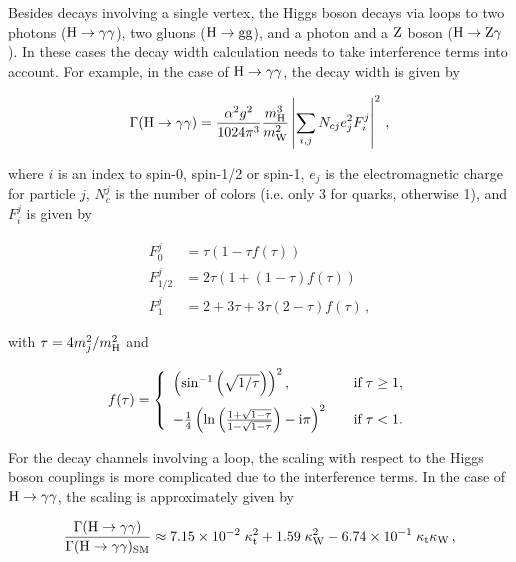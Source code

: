 Besides decays involving a single vertex, the Higgs boson decays via loops to two photons ($\mathrm{H}\to\mathrm{\gamma}\mathrm{\gamma}$), two gluons ($\mathrm{H}\to\mathrm{g}\mathrm{g}$), and a photon and a $\mathrm{Z}$ boson ($\mathrm{H}\to\mathrm{Z}\mathrm{\gamma}$).
% 
In these cases the decay width calculation needs to take interference terms into account.
% 
For example, in the case of $\mathrm{H}\to\mathrm{\gamma}\mathrm{\gamma}$, the decay width is given by~\cite{higgshunter}
% 
\begin{linenomath*}
\begin{equation}
\Gamma(\mathrm{H}\to\mathrm{\gamma}\mathrm{\gamma}) =
\frac{\alpha^2g^2}{1024\pi^3} \frac{m_{\mathrm{H}}^3}{m_\mathrm{W}^2}
\left|
\sum_{i,j} N_{cj} e_j^2 F_i^j
\right|^2
\,,
\end{equation}
\end{linenomath*}
% 
where $i$ is an index to spin-0, spin-1/2 or spin-1, $e_j$ is the electromagnetic charge  for particle $j$, $N_c^j$ is the number of colors (i.e. only 3 for quarks, otherwise 1), and $F_i^j$ is given by
% 
\begin{linenomath*}
\begin{equation}
\begin{split}
F_0^j     &= \tau (1- \tau f(\tau)) \\
F_{1/2}^j &= 2\tau ( 1 + (1-\tau) f(\tau) ) \\
F_1^j     &= 2 + 3\tau + 3\tau( 2-\tau ) f(\tau)
\,,
\end{split}
\end{equation}
\end{linenomath*}
% 
with $\tau = 4m_j^2/m_{\mathrm{H}}^2$ and
% 
\begin{linenomath*}
\begin{equation}
\label{eq:ffunction}
f(\tau) = \left\{%
\begin{array}{ll}
\left( \text{sin}^{-1}\left(\sqrt{1/\tau}\right) \right)^2 ,
    & \quad \text{if} \; \tau \ge 1, \\[9pt]
-\frac{1}{4} \left(
        \ln \left(\frac{1+\sqrt{1-\tau}}{1-\sqrt{1-\tau}} \right)
        -\imag \pi 
        \right)^2
    & \quad \text{if} \; \tau < 1.
\end{array}%
\right. 
\end{equation}
\end{linenomath*}
% 
For the decay channels involving a loop, the scaling with respect to the Higgs boson couplings is more complicated due to the interference terms.
% 
In the case of $\mathrm{H}\to\mathrm{\gamma}\mathrm{\gamma}$, the scaling is approximately given by~\cite{higgshunter}
% 
\begin{linenomath*}
\begin{equation}
\frac{\Gamma(\mathrm{H}\to\mathrm{\gamma}\mathrm{\gamma})}{\Gamma(\mathrm{H}\to\mathrm{\gamma}\mathrm{\gamma})_\text{SM}} \approx
        7.15 \times 10^{-2}    \;   \kappa_{\mathrm{t}}^2
        + 1.59                \;  \kappa_{\mathrm{W}}^2
        - 6.74 \times 10^{-1} \;  \kappa_{\mathrm{t}}\kappa_{\mathrm{W}}
\,,
\end{equation}
\end{linenomath*}

